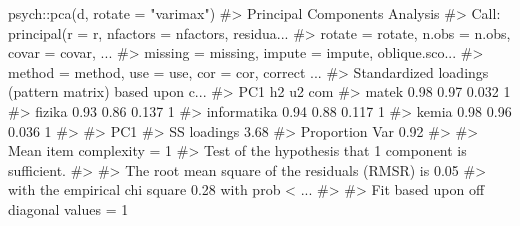 \documentclass[
  letterpaper,
]{krantz}
\makeatletter
\newenvironment{Shaded}{\begin{snugshade}}{\end{snugshade}}
\newcommand{\AttributeTok}[1]{\textcolor[rgb]{0.40,0.45,0.13}{#1}}
\newcommand{\CommentTok}[1]{\textcolor[rgb]{0.37,0.37,0.37}{#1}}
\newcommand{\FunctionTok}[1]{\textcolor[rgb]{0.28,0.35,0.67}{#1}}
\newcommand{\NormalTok}[1]{\textcolor[rgb]{0.00,0.23,0.31}{#1}}
\newcommand{\SpecialCharTok}[1]{\textcolor[rgb]{0.37,0.37,0.37}{#1}}
\newcommand{\StringTok}[1]{\textcolor[rgb]{0.13,0.47,0.30}{#1}}
\newenvironment{kframe}{%
\medskip{}
\setlength{\fboxsep}{.8em}
 \def\at@end@of@kframe{}%
 \ifinner\ifhmode%
  \def\at@end@of@kframe{\end{minipage}}%
  \begin{minipage}{\columnwidth}%
 \fi\fi%
 \def\FrameCommand##1{\hskip\@totalleftmargin \hskip-\fboxsep
 \colorbox{shadecolor}{##1}\hskip-\fboxsep
     \hskip-\linewidth \hskip-\@totalleftmargin \hskip\columnwidth}%
 \MakeFramed {\advance\hsize-\width
   \@totalleftmargin\z@ \linewidth\hsize
   \@setminipage}}%
 {\par\unskip\endMakeFramed%
 \at@end@of@kframe}
\renewenvironment{Shaded}{\begin{kframe}}{\end{kframe}}
\makeatother
\begin{document}
\begin{Shaded}
\begin{Highlighting}[]
\NormalTok{psych}\SpecialCharTok{::}\FunctionTok{pca}\NormalTok{(d, }\AttributeTok{rotate =} \StringTok{"varimax"}\NormalTok{)}
\CommentTok{\#\textgreater{} Principal Components Analysis}
\CommentTok{\#\textgreater{} Call: principal(r = r, nfactors = nfactors, residua...}
\CommentTok{\#\textgreater{}     rotate = rotate, n.obs = n.obs, covar = covar, ...}
\CommentTok{\#\textgreater{}     missing = missing, impute = impute, oblique.sco...}
\CommentTok{\#\textgreater{}     method = method, use = use, cor = cor, correct ...}
\CommentTok{\#\textgreater{} Standardized loadings (pattern matrix) based upon c...}
\CommentTok{\#\textgreater{}              PC1   h2    u2 com}
\CommentTok{\#\textgreater{} matek       0.98 0.97 0.032   1}
\CommentTok{\#\textgreater{} fizika      0.93 0.86 0.137   1}
\CommentTok{\#\textgreater{} informatika 0.94 0.88 0.117   1}
\CommentTok{\#\textgreater{} kemia       0.98 0.96 0.036   1}
\CommentTok{\#\textgreater{} }
\CommentTok{\#\textgreater{}                 PC1}
\CommentTok{\#\textgreater{} SS loadings    3.68}
\CommentTok{\#\textgreater{} Proportion Var 0.92}
\CommentTok{\#\textgreater{} }
\CommentTok{\#\textgreater{} Mean item complexity =  1}
\CommentTok{\#\textgreater{} Test of the hypothesis that 1 component is sufficient.}
\CommentTok{\#\textgreater{} }
\CommentTok{\#\textgreater{} The root mean square of the residuals (RMSR) is  0.05 }
\CommentTok{\#\textgreater{}  with the empirical chi square  0.28  with prob \textless{}  ...}
\CommentTok{\#\textgreater{} }
\CommentTok{\#\textgreater{} Fit based upon off diagonal values = 1}
\end{Highlighting}
\end{Shaded}
\end{document}

